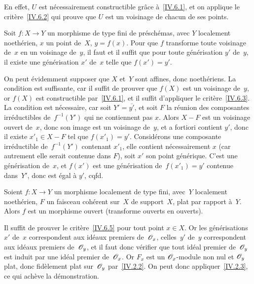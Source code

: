 En effet, $U$ est n\'ecessairement constructible gr\^ace
\`a~\ref{IV.6.1}, et on applique le crit\`ere~\ref{IV.6.2} qui
prouve que $U$ est un voisinage de chacun de ses points.

\begin{corollaire}
\label{IV.6.5}
Soit $f\colon X\to Y$ un morphisme de type fini de pr\'esch\'emas,
avec $Y$ localement noeth\'erien, $x$ un point de~$X$, $y=f(x)$.
Pour que $f$ transforme toute voisinage de~$x$ en un voisinage de~$y$,
il faut et il suffit que pour toute g\'en\'erisation $y'$ de~$y$,
il existe une g\'en\'erisation $x'$ de~$x$ telle que $f(x')=y'$.
\end{corollaire}

On peut \'evidemment supposer que $X$ et~$Y$ sont affines, donc
noeth\'eriens. La condition est suffisante, car il suffit de
prouver que $f(X)$ est un voisinage de~$y$, or $f(X)$ est
constructible par~\ref{IV.6.1}, et il suffit d'appliquer le
crit\`ere~\ref{IV.6.3}. La condition est n\'ecessaire, car soit
$Y'=\overline{y'}$, et soit $F$ la r\'eunion des composantes
irr\'eductibles de~$f^{-1}(Y')$ qui ne contiennent pas $x$. Alors
$X-F$ est un voisinage ouvert de~$x$, donc son image est un voisinage
de~$y$, et a fortiori contient $y'$, donc il existe $x'_1\in X-F$ tel
que $f(x'_1)=y'$. Consid\'erons une composante irr\'eductible
de~$f^{-1}(Y')$ contenant $x'_1$, elle contient n\'ecessairement $x$
(car autrement elle serait contenue dans $F$), soit $x'$ son point
g\'en\'erique. C'est une g\'en\'erisation de~$x$, et $f(x')$
est une g\'en\'erisation de~$f(x'_1)=y'$ contenue dans~$Y'$, donc
est \'egal \`a $y'$, cqfd.

\begin{theoreme}
\label{IV.6.6}
Soient $f\colon X\to Y$ un morphisme localement de type fini, avec~$Y$
localement noeth\'erien, $F$ un faisceau coh\'erent sur~$X$ de
support~$X$, plat par rapport \`a~$Y$. Alors $f$ est un morphisme
ouvert (\iev transforme ouverts en ouverts).
\end{theoreme}

Il suffit de prouver le crit\`ere~\ref{IV.6.5} pour tout point $x\in
X$. Or les g\'en\'erisations $x'$ de~$x$ correspondent aux
id\'eaux premiers de~$\cal{O}_x$, celles~$y'$ de~$y$ correspondent
aux id\'eaux premiers de~$\cal{O}_y$, et il faut donc v\'erifier
que tout id\'eal premier de~$\cal{O}_y$ est induit par une id\'eal
premier de~$\cal{O}_x$. Or $F_x$ est un $\cal{O}_x$-module non nul et
$\cal{O}_y$ plat, donc fid\`element plat sur~$\cal{O}_y$
par~\ref{IV.2.2}. On peut donc appliquer~\ref{IV.2.3}, ce qui
ach\`eve la d\'emonstration.

